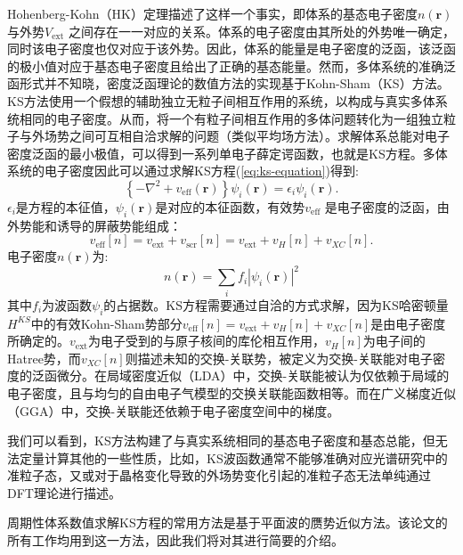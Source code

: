 Hohenberg-Kohn（HK）定理描述了这样一个事实，即体系的基态电子密度$n(\bm{r})$与外势$V_\mathrm{ext}$ 之间存在一一对应的关系。体系的电子密度由其所处的外势唯一确定，同时该电子密度也仅对应于该外势。因此，体系的能量是电子密度的泛函，该泛函的极小值对应于基态电子密度且给出了正确的基态能量。然而，多体系统的准确泛函形式并不知晓，密度泛函理论的数值方法的实现基于Kohn-Sham（KS）方法。KS方法使用一个假想的辅助独立无粒子间相互作用的系统，以构成与真实多体系统相同的电子密度。从而，将一个有粒子间相互作用的多体问题转化为一组独立粒子与外场势之间可互相自洽求解的问题（类似平均场方法）。求解体系总能对电子密度泛函的最小极值，可以得到一系列单电子薛定谔函数，也就是KS方程。多体系统的电子密度因此可以通过求解KS方程(\ref{eq:ks-equation})得到:
\begin{equation}\label{eq:ks-equation}
  \left\{ -\nabla^2 + v_{\mathrm{eff}}(\bm{r}) \right\}\psi_i(\bm{r}) = \epsilon_i \psi_i (\bm{r}).
\end{equation}
$\epsilon_i$是方程的本征值，$\psi_i(\bm{r})$是对应的本征函数，有效势$v_{\mathrm{eff}}$ 是电子密度的泛函，由外势能和诱导的屏蔽势能组成：
\begin{equation}
  v_{\mathrm{eff}}[n] = v_{\mathrm{ext}} + v_{\mathrm{scr}}[n] =
  v_{\mathrm{ext}} + v_{H}[n] + v_{XC}[n].
\end{equation}
电子密度$n(\bm{r})$为:
\begin{equation}
  n(\bm{r}) = \sum_i f_i |\psi_i(\bm{r})|^2
\end{equation}
其中$f_i$为波函数$\psi_i$的占据数。KS方程需要通过自洽的方式求解，因为KS哈密顿量$H^{KS}$中的有效Kohn-Sham势部分$v_{\mathrm{eff}}[n]=v_{\mathrm{ext}} + v_{H}[n] + v_{XC}[n]$是由电子密度所确定的。$v_{\mathrm{ext}}$为电子受到的与原子核间的库伦相互作用，$v_{H}[n]$为电子间的Hatree势，而$v_{XC}[n]$则描述未知的交换-关联势，被定义为交换-关联能对电子密度的泛函微分。在局域密度近似（LDA）中，交换-关联能被认为仅依赖于局域的电子密度，且与均匀的自由电子气模型的交换关联能函数相等。而在广义梯度近似（GGA）中，交换-关联能还依赖于电子密度空间中的梯度。

我们可以看到，KS方法构建了与真实系统相同的基态电子密度和基态总能，但无法定量计算其他的一些性质，比如，KS波函数通常不能够准确对应光谱研究中的准粒子态，又或对于晶格变化导致的外场势变化引起的准粒子态无法单纯通过DFT理论进行描述。

周期性体系数值求解KS方程的常用方法是基于平面波的赝势近似方法。该论文的所有工作均用到这一方法，因此我们将对其进行简要的介绍。

